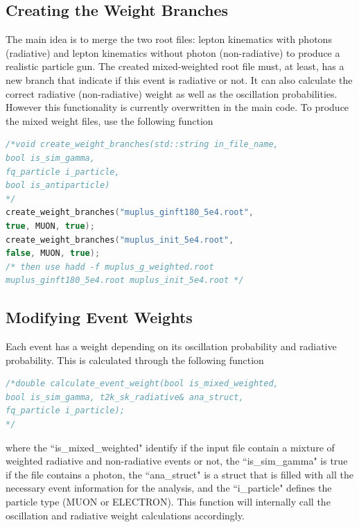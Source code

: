\documentclass[12pt]{article}
\begin{document}
\subsection{Creating the Weight Branches}
The main idea is to merge the two root files: lepton kinematics with photons (radiative) and lepton kinematics without photon (non-radiative) to produce a realistic particle gun. The created mixed-weighted root file must, at least, has a new branch that indicate if this event is radiative or not. It can also calculate the correct radiative (non-radiative) weight as well as the oscillation probabilities. However this functionality is currently overwritten in the main code.
To produce the mixed weight files, use the following function 
\begin{lstlisting}[language=C++, caption=Creating Weight Branch Example]
/*void create_weight_branches(std::string in_file_name,
bool is_sim_gamma,
fq_particle i_particle,
bool is_antiparticle)
*/
create_weight_branches("muplus_ginft180_5e4.root",
true, MUON, true);
create_weight_branches("muplus_init_5e4.root",
false, MUON, true);
/* then use hadd -f muplus_g_weighted.root
muplus_ginft180_5e4.root muplus_init_5e4.root */							
\end{lstlisting} 

\subsection{Modifying Event Weights}
Each event has a weight depending on its oscillation probability and radiative probability. This is calculated through the following function
\begin{lstlisting}[language=C++, caption= Calculating Event Weight]
/*double calculate_event_weight(bool is_mixed_weighted,
bool is_sim_gamma, t2k_sk_radiative& ana_struct,
fq_particle i_particle);
*/						
\end{lstlisting}

where the ``is\_mixed\_weighted" identify if the input file contain a mixture of weighted radiative and non-radiative events or not, the ``is\_sim\_gamma" is true if the file contains a photon, the ``ana\_struct" is a struct that is filled with all the necessary event information for the analysis, and the ``i\_particle" defines the particle type (MUON or ELECTRON).
This function will internally call the oscillation and radiative weight calculations accordingly.  
\end{document}

